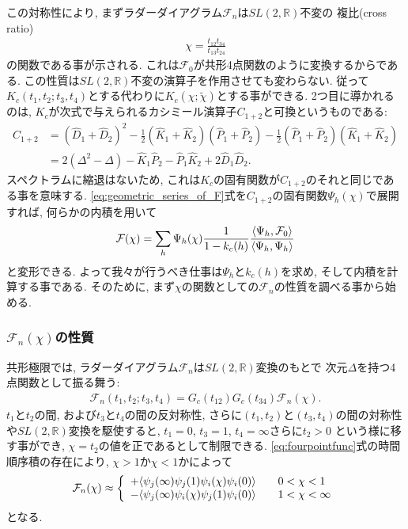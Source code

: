 この対称性により, まずラダーダイアグラム$\mathcal{F}_n$は$SL(2, \mathbb{R})$不変の
複比(cross ratio)
\begin{align}
	\chi = \frac{t_{12}t_{34}}{t_{13}t_{24}}
\end{align}
の関数である事が示される. 
これは$\mathcal{F}_0$が共形4点関数のように変換するからである. 
この性質は$SL(2, \mathbb{R})$不変の演算子を作用させても変わらない. 
従って$K_c(t_1, t_2; t_3, t_4)$とする代わりに$K_c(\chi; \tilde{\chi})$とする事ができる. 
2つ目に導かれるのは, $K_c$が次式で与えられるカシミール演算子$C_{1+2}$と可換というものである:
\begin{align}
	C_{1+2}
	&= (\hat{D}_1 + \hat{D}_2)^2
	- \frac{1}{2}(\hat{K}_1 + \hat{K}_2)(\hat{P}_1 + \hat{P}_2)
	- \frac{1}{2}(\hat{P}_1 + \hat{P}_2)(\hat{K}_1 + \hat{K}_2)\nonumber\\
	&= 2(\Delta^2 - \Delta) - \hat{K}_1\hat{P}_2 - \hat{P}_1\hat{K}_2 + 2\hat{D}_1\hat{D}_2.
	\label{eq:casimir_operator}
\end{align}
スペクトラムに縮退はないため, これは$K_c$の固有関数が$C_{1+2}$のそれと同じである事を意味する. 
\eqref{eq:geometric_series_of_F}式を$C_{1+2}$の固有関数$\Psi_h(\chi)$で展開すれば, 
何らかの内積を用いて
\begin{align}
	\mathcal{F}(\chi)
	= \sum_h \Psi_h(\chi)\frac{1}{1 - k_c(h)}
		\frac{\langle \Psi_h, \mathcal{F}_0 \rangle}{\langle \Psi_h, \Psi_h \rangle}
	\label{eq:final_F_chi}
\end{align}
と変形できる. 
よって我々が行うべき仕事は$\Psi_h$と$k_c(h)$を求め, そして内積を計算する事である. 
そのために, まず$\chi$の関数としての$\mathcal{F}_n$の性質を調べる事から始める. 

\subsubsection{$\mathcal{F}_n(\chi)$の性質}
共形極限では, ラダーダイアグラム$\mathcal{F}_n$は$SL(2, \mathbb{R})$変換のもとで
次元$\Delta$を持つ4点関数として振る舞う:
\begin{align}
	\mathcal{F}_n(t_1, t_2; t_3, t_4)
	= G_c(t_{12})G_c(t_{34})\mathcal{F}_n(\chi).
\end{align}
$t_1$と$t_2$の間, および$t_3$と$t_4$の間の反対称性, さらに$(t_1, t_2)$と$(t_3, t_4)$の間の対称性
や$SL(2, \mathbb{R})$変換を駆使すると, $t_1 = 0$, $t_3 = 1$, $t_4 = \infty$さらに$t_2 > 0$
という様に移す事ができ, $\chi = t_2$の値を正であるとして制限できる. 
\eqref{eq:fourpointfunc}式の時間順序積の存在により, $\chi > 1$か$\chi < 1$かによって
\begin{align}
	\mathcal{F}_n(\chi)
	\approx \left\{
		\begin{array}{l}
			+\langle \psi_j(\infty)\psi_j(1)\psi_i(\chi)\psi_i(0) \rangle\hspace{20pt}
			0 < \chi < 1\\
			-\langle \psi_j(\infty)\psi_i(\chi)\psi_j(1)\psi_i(0) \rangle\hspace{20pt}
			1 < \chi < \infty
		\end{array}
	\right.
\end{align}
となる. 

